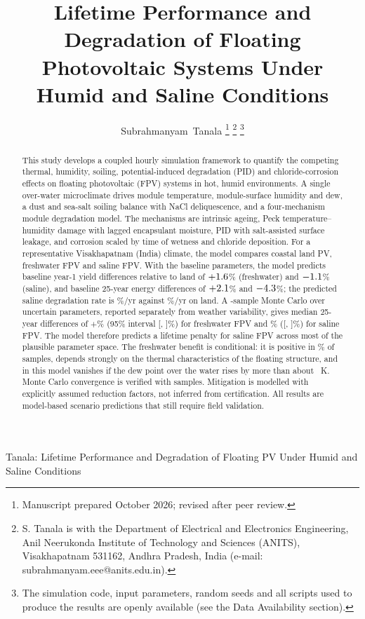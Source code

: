 \documentclass[journal]{IEEEtran}
\begin{document}

\title{Lifetime Performance and Degradation of Floating Photovoltaic Systems Under Humid and Saline Conditions}

\author{Subrahmanyam~Tanala%
\thanks{Manuscript prepared October 2026; revised after peer review.}%
\thanks{S. Tanala is with the Department of Electrical and Electronics Engineering, Anil Neerukonda Institute of Technology and Sciences (ANITS), Visakhapatnam 531162, Andhra Pradesh, India (e-mail: subrahmanyam.eee@anits.edu.in).}%
\thanks{The simulation code, input parameters, random seeds and all scripts used to produce the results are openly available (see the Data Availability section).}}

%
{Tanala: Lifetime Performance and Degradation of Floating PV Under Humid and Saline Conditions}

\maketitle

\begin{abstract}
This study develops a coupled hourly simulation framework to quantify the competing thermal, humidity, soiling,
potential-induced degradation (PID) and chloride-corrosion effects on floating photovoltaic (FPV) systems in hot, humid
environments. A single over-water microclimate drives module temperature, module-surface humidity and dew, a dust and
sea-salt soiling balance with NaCl deliquescence, and a four-mechanism module degradation model. The mechanisms are
intrinsic ageing, Peck temperature--humidity damage with lagged encapsulant moisture, PID with salt-assisted surface
leakage, and corrosion scaled by time of wetness and chloride deposition. For a representative Visakhapatnam (India)
climate, the model compares coastal land PV, freshwater FPV and saline FPV. With the baseline parameters, the model
predicts baseline year-1 yield differences relative to land of $+1.6$\% (freshwater) and $-1.1$\%
(saline), and baseline 25-year energy differences of $+2.1$\% and $-4.3$\%; the predicted saline degradation rate is
\DegTotS\%/yr against \DegTotL\%/yr on land. A \NMC-sample Monte Carlo over \NParams{} uncertain parameters, reported
separately from weather variability, gives median 25-year differences of $+$\MCLifeMedF\% (95\% interval
[\MCLifeLoF, \MCLifeHiF]\%) for freshwater FPV and \MCLifeMedS\% ([\MCLifeLoS, \MCLifeHiS]\%) for saline FPV. The model
therefore predicts a lifetime penalty for saline FPV across most of the plausible parameter space. The freshwater
benefit is conditional: it is positive in \MCLifePosF\% of samples, depends strongly on the thermal characteristics of the
floating structure, and in this model vanishes if the dew point over the water rises by more than about \DTdStar~K.
Monte Carlo convergence is verified with \NMCConv{} samples. Mitigation is
modelled with explicitly assumed reduction factors, not inferred from certification. All results are model-based
scenario predictions that still require field validation.
\end{abstract}
\end{document}
